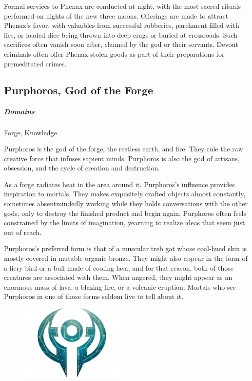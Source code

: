         Formal services to Phenax are conducted at night, with the most sacred rituals performed on nights of the new three moons.
        Offerings are made to attract Phenax's favor, with valuables from successful robberies, parchment filled with lies, or loaded dice being thrown into deep crags or buried at crossroads.
        Such sacrifices often vanish soon after, claimed by the god or their servants.
        Devout criminals often offer Phenax stolen goods as part of their preparations for premeditated crimes.


\subsection*{Purphoros, God of the Forge} \label{ssec::purphoros}
    \subparagraph{Domains} Forge, Knowledge.

    Purphoros is the god of the forge, the restless earth, and fire.
    They rule the raw creative force that infuses sapient minds.
    Purphoros is also the god of artisans, obsession, and the cycle of creation and destruction.

    As a forge radiates heat in the area around it, Purphoros's influence provides inspiration to mortals.
    They makes exquisitely crafted objects almost constantly, sometimes absentmindedly working while they holds conversations with the other gods, only to destroy the finished product and begin again.
    Purphoros often feels constrained by the limits of imagination, yearning to realize ideas that seem just out of reach.

    Purphoros's preferred form is that of a muscular treb gat whose coal-hued skin is mostly covered in mutable organic bronze.
    They might also appear in the form of a fiery bird or a bull made of cooling lava, and for that reason, both of those creatures are associated with them.
    When angered, they might appear as an enormous mass of lava, a blazing fire, or a volcanic eruption.
    Mortals who see Purphoros in one of those forms seldom live to tell about it.

    \begin{figure}[b]
        \centering
        \includegraphics[width=0.47\textwidth]{02viphoger/img/10s_purphoros.png}
    \end{figure}

